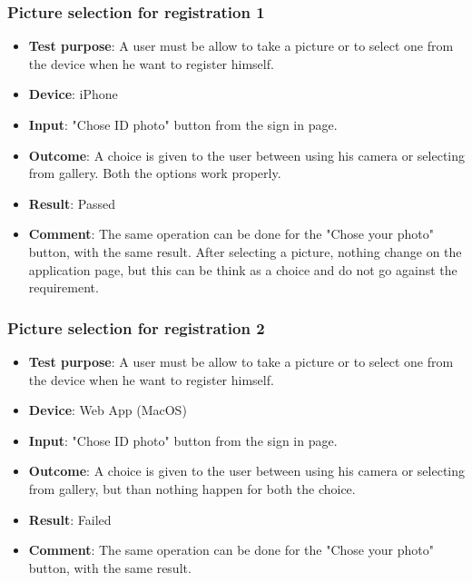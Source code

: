 \documentclass[../ATD.tex]{subfiles}
\begin{document}
    \subsubsection{Picture selection for registration 1}\label{subsubsec:picture-selection-for-registration-1}
    \begin{itemize}
        \item \textbf{Test purpose}: A user must be allow to take a picture or to select one from the device when he want to register himself.
        \item \textbf{Device}: iPhone
        \item \textbf{Input}: "Chose ID photo" button from the sign in page.
        \item \textbf{Outcome}: A choice is given to the user between using his camera or selecting from gallery.
        Both the options work properly.
        \item \textbf{Result}: Passed
        \item \textbf{Comment}: The same operation can be done for the "Chose your photo" button, with the same result.
        After selecting a picture, nothing change on the application page, but this can be think as a choice and do not go against the requirement.
    \end{itemize}

    \subsubsection{Picture selection for registration 2}\label{subsubsec:picture-selection-for-registration-2}
    \begin{itemize}
        \item \textbf{Test purpose}: A user must be allow to take a picture or to select one from the device when he want to register himself.
        \item \textbf{Device}: Web App (MacOS)
        \item \textbf{Input}: "Chose ID photo" button from the sign in page.
        \item \textbf{Outcome}: A choice is given to the user between using his camera or selecting from gallery, but than nothing happen for both the choice.
        \item \textbf{Result}: Failed
        \item \textbf{Comment}: The same operation can be done for the "Chose your photo" button, with the same result.
    \end{itemize}
\end{document}
